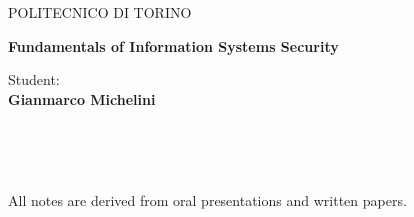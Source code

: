 \begin{titlepage}
\begin{figure}[!htb]
    \centering
\end{figure}
\vspace{30mm}
\begin{center}
    \LARGE{POLITECNICO DI TORINO}
    \vspace{5mm}
\end{center}

\vspace{15mm}
\begin{center}        
    {\LARGE{\bf Fundamentals of Information Systems Security}}
\end{center}
\vspace{30mm}

\hfill
\begin{center}

\large{Student:}
{\normalsize\vspace{3mm} \bf\\ \large{Gianmarco Michelini}}
\end{center}


\vspace{30mm}
\hrulefill
\\

\clearpage
\
\vfill
\begin{center}
    \large{All notes are derived from oral presentations and written papers.}
\end{center}
\vfill

\end{titlepage}